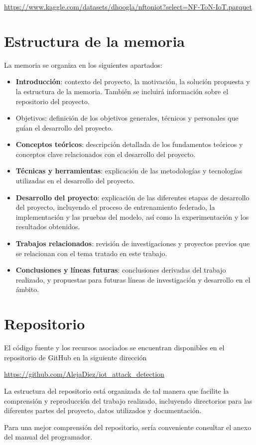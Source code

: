 \url{https://www.kaggle.com/datasets/dhoogla/nftoniot?select=NF-ToN-IoT.parquet}

\section{Estructura de la memoria}
La memoria se organiza en los siguientes apartados:
\begin{itemize}
    \item \textbf{Introducción}: contexto del proyecto, la motivación, la solución propuesta y la estructura de la memoria. También se incluirá información sobre el repositorio del proyecto.
    \item Objetivos: definición de los objetivos generales, técnicos y personales que guían el desarrollo del proyecto.
    \item \textbf{Conceptos teóricos}: descripción detallada de los fundamentos teóricos y conceptos clave relacionados con el desarrollo del proyecto.
    \item \textbf{Técnicas y herramientas}: explicación de las metodologías y tecnologías utilizadas en el desarrollo del proyecto.
    \item \textbf{Desarrollo del proyecto}: explicación de las diferentes etapas de desarrollo del proyecto, incluyendo el proceso de entrenamiento federado, la implementación y las pruebas del modelo, así como la experimentación y los resultados obtenidos.
    \item \textbf{Trabajos relacionados}: revisión de investigaciones y proyectos previos que se relacionan con el tema tratado en este trabajo.
    \item \textbf{Conclusiones y líneas futuras}: conclusiones derivadas del trabajo realizado, y propuestas para futuras líneas de investigación y desarrollo en el ámbito.
\end{itemize}

\section{Repositorio}
El código fuente y los recursos asociados se encuentran disponibles en el repositorio de GitHub en la siguiente dirección

\url{https://github.com/AlejaDiez/iot_attack_detection}

La estructura del repositorio está organizada de tal manera que facilite la comprensión y reproducción del trabajo realizado, incluyendo directorios para las diferentes partes del proyecto, datos utilizados y documentación.

Para una mejor comprensión del repositorio, sería conveniente consultar el anexo del manual del programador.
